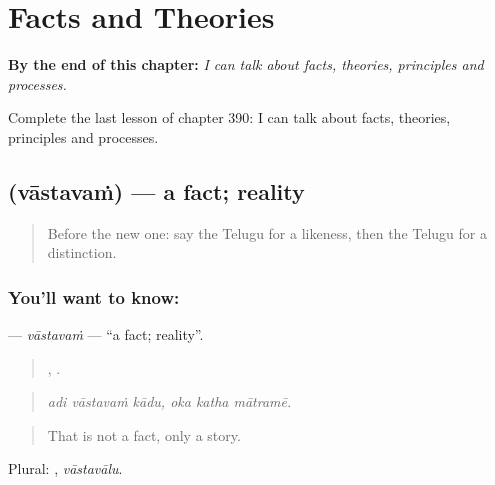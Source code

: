 
\chapter{Facts and Theories}
\label{ch:te-facts-and-theories}

\begin{chapteropening}
\textbf{By the end of this chapter:} \emph{I can talk about facts, theories, principles and processes.}

Complete the last lesson of chapter 390: I can talk about facts, theories, principles and processes.
\end{chapteropening}

\section[\texorpdfstring{\te{వాస్తవం} (vāstavaṁ)}{వాస్తవం (vāstavaṁ)}]{ (vāstavaṁ) — a fact; reality}

\label{lesson:TE-C390-vastavam}



\begin{quote}
Before the new one: say the Telugu for a likeness, then the Telugu for a distinction.
\end{quote}

\subsection*{You'll want to know: }
\textbf{} — \emph{vāstavaṁ} — \textquotedblleft{}a fact; reality\textquotedblright{}.

\begin{quote}
  ,   .
\end{quote}

\begin{quote}
\emph{adi vāstavaṁ kādu, oka katha mātramē.}
\end{quote}

\begin{quote}
That is not a fact, only a story.
\end{quote}

Plural: , \emph{vāstavālu}.

